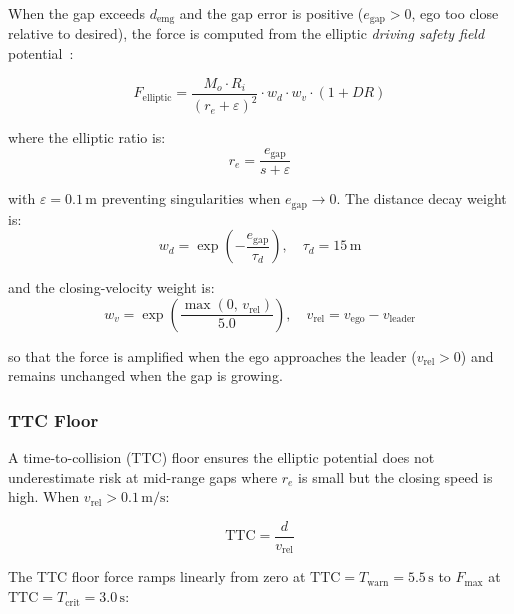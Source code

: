 \documentclass[12pt,a4paper,oneside]{report}
\begin{document}
When the gap exceeds $d_{\mathrm{emg}}$ and the gap error is positive ($e_{\mathrm{gap}} > 0$, ego too close relative to desired), the force is computed from the elliptic \textit{driving safety field} potential~\cite{liSharedControlNovel2019}:

\begin{equation}
F_{\mathrm{elliptic}} = \frac{M_o \cdot R_i}{\left(r_e + \varepsilon\right)^2} \cdot w_d \cdot w_v \cdot \left(1 + DR\right)
\label{eq:elliptic_force}
\end{equation}

where the elliptic ratio is:
\begin{equation}
r_e = \frac{e_{\mathrm{gap}}}{s + \varepsilon}
\label{eq:elliptic_ratio}
\end{equation}

with $\varepsilon = 0.1\,\mathrm{m}$ preventing singularities when $e_{\mathrm{gap}} \to 0$. The distance decay weight is:
\begin{equation}
w_d = \exp\!\left(-\frac{e_{\mathrm{gap}}}{\tau_d}\right), \quad \tau_d = 15\,\mathrm{m}
\label{eq:dist_decay}
\end{equation}

and the closing-velocity weight is:
\begin{equation}
w_v = \exp\!\left(\frac{\max(0,\, v_{\mathrm{rel}})}{5.0}\right), \quad v_{\mathrm{rel}} = v_{\mathrm{ego}} - v_{\mathrm{leader}}
\label{eq:vel_weight}
\end{equation}

so that the force is amplified when the ego approaches the leader ($v_{\mathrm{rel}} > 0$) and remains unchanged when the gap is growing.

\subsubsection{TTC Floor}

A time-to-collision (TTC) floor ensures the elliptic potential does not underestimate risk at mid-range gaps where $r_e$ is small but the closing speed is high. When $v_{\mathrm{rel}} > 0.1\,\mathrm{m/s}$:

\begin{equation}
\mathrm{TTC} = \frac{d}{v_{\mathrm{rel}}}
\label{eq:ttc}
\end{equation}

The TTC floor force ramps linearly from zero at $\mathrm{TTC} = T_{\mathrm{warn}} = 5.5\,\mathrm{s}$ to $F_{\max}$ at $\mathrm{TTC} = T_{\mathrm{crit}} = 3.0\,\mathrm{s}$:
\end{document}
